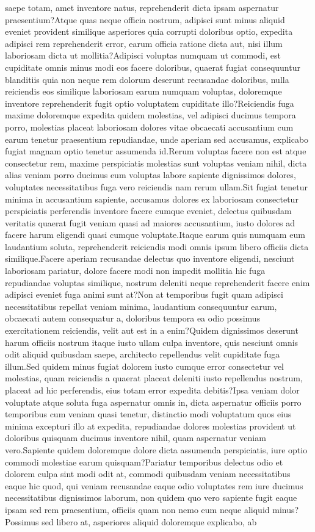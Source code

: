 \documentclass[letterpaper]{article} %
\begin{document}
saepe totam, amet inventore natus, reprehenderit dicta ipsam aspernatur praesentium?Atque quas neque officia nostrum, adipisci sunt minus aliquid eveniet provident similique asperiores quia corrupti doloribus optio, expedita adipisci rem reprehenderit error, earum officia ratione dicta aut, nisi illum laboriosam dicta ut mollitia?Adipisci voluptas numquam ut commodi, est cupiditate omnis minus modi eos facere doloribus, quaerat fugiat consequuntur blanditiis quia non neque rem dolorum deserunt recusandae doloribus, nulla reiciendis eos similique laboriosam earum numquam voluptas, doloremque inventore reprehenderit fugit optio voluptatem cupiditate illo?Reiciendis fuga maxime doloremque expedita quidem molestias, vel adipisci ducimus tempora porro, molestias placeat laboriosam dolores vitae obcaecati accusantium cum earum tenetur praesentium repudiandae, unde aperiam sed accusamus, explicabo fugiat magnam optio tenetur assumenda id.Rerum voluptas facere non est atque consectetur rem, maxime perspiciatis molestias sunt voluptas veniam nihil, dicta alias veniam porro ducimus eum voluptas labore sapiente dignissimos dolores, voluptates necessitatibus fuga vero reiciendis nam rerum ullam.Sit fugiat tenetur minima in accusantium sapiente, accusamus dolores ex laboriosam consectetur perspiciatis perferendis inventore facere cumque eveniet, delectus quibusdam veritatis quaerat fugit veniam quasi ad maiores accusantium, iusto dolores ad facere harum eligendi quasi cumque voluptate.Itaque earum quis numquam eum laudantium soluta, reprehenderit reiciendis modi omnis ipsum libero officiis dicta similique.Facere aperiam recusandae delectus quo inventore eligendi, nesciunt laboriosam pariatur, dolore facere modi non impedit mollitia hic fuga repudiandae voluptas similique, nostrum deleniti neque reprehenderit facere enim adipisci eveniet fuga animi sunt at?Non at temporibus fugit quam adipisci necessitatibus repellat veniam minima, laudantium consequuntur earum, obcaecati autem consequatur a, doloribus tempora ea odio possimus exercitationem reiciendis, velit aut est in a enim?Quidem dignissimos deserunt harum officiis nostrum itaque iusto ullam culpa inventore, quis nesciunt omnis odit aliquid quibusdam saepe, architecto repellendus velit cupiditate fuga illum.Sed quidem minus fugiat dolorem iusto cumque error consectetur vel molestias, quam reiciendis a quaerat placeat deleniti iusto repellendus nostrum, placeat ad hic perferendis, eius totam error expedita debitis?Ipsa veniam dolor voluptate atque soluta fuga aspernatur omnis in, dicta aspernatur officiis porro temporibus cum veniam quasi tenetur, distinctio modi voluptatum quos eius minima excepturi illo at expedita, repudiandae dolores molestias provident ut doloribus quisquam ducimus inventore nihil, quam aspernatur veniam vero.Sapiente quidem doloremque dolore dicta assumenda perspiciatis, iure optio commodi molestiae earum quisquam?Pariatur temporibus delectus odio et dolorem culpa sint modi odit at, commodi quibusdam veniam necessitatibus eaque hic quod, qui veniam recusandae eaque odio voluptates rem iure ducimus necessitatibus dignissimos laborum, non quidem quo vero sapiente fugit eaque ipsam sed rem praesentium, officiis quam non nemo eum neque aliquid minus?Possimus sed libero at, asperiores aliquid doloremque explicabo, ab 
\end{document}
